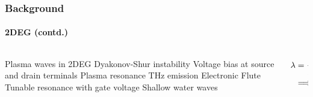 \documentclass[mathserif,16pt,xcolor=table]{beamer}
\begin{document}
            \begin{frame}
              \frametitle{Background}
              \framesubtitle{2DEG (contd.)}

              \begin{columns} %
                \begin{column}{.5\textwidth}
                  \begin{minipage}[T][.1\textheight][c]{\linewidth}
                    \begin{outline}[itemize]
                      \1 Plasma waves in 2DEG
                      \1 Dyakonov-Shur instability
                        \2 Voltage bias at source and drain terminals
                        \2 Plasma resonance
                        \2 THz emission
                      \1 Electronic Flute
                        \2 Tunable resonance with gate voltage
                      \1 Shallow water waves
                    \end{outline}
                  \end{minipage}
                \end{column}
                \begin{column}{.5\textwidth}
                  \begin{figure}
                    \hspace*{-.55cm}
                    \fontsize{6}{7}\selectfont
                    \def\svgwidth{1.1\linewidth}
                    
                  \end{figure}
                  \begin{equation} \nonumber
                    \begin{split}
                      \lambda &= \frac{c}{f} \\
                      & \Longrightarrow  300 \mu \mathrm{m}
                    \end{split}
                    \label{eq:disp_TE_two}
                  \end{equation}
                  \end{column}%
                \end{columns}
              \end{frame}
\end{document}
